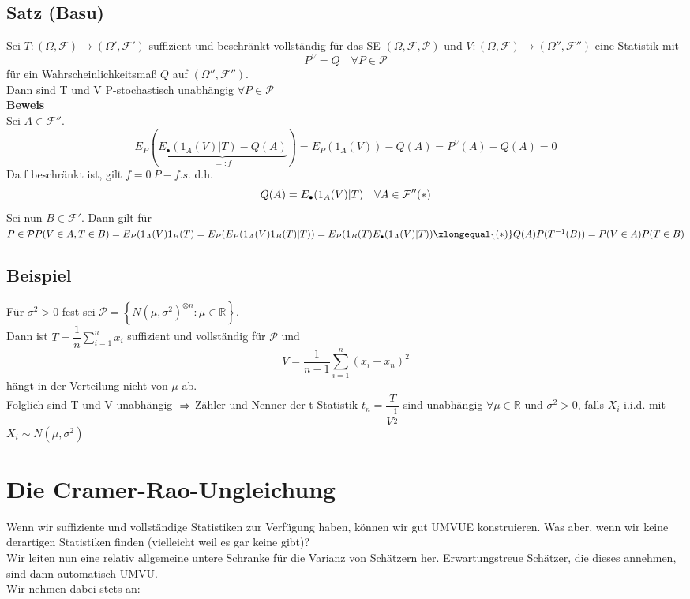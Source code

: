 \documentclass[german,10pt,oneside, fleqn, a4paper]{article}
\newcommand {\R}	{\mathbb{R}}
\newcommand{\Ra}	{\Rightarrow}
\newcommand{\ra}{\rightarrow}
\newcommand{\sm}[2][\infty]{\sum\limits_{#2}^{#1}}
\newcommand{\brc}[1]{\left(#1\right)}
\newcommand{\brac}[1]{\left\lbrace #1\right\rbrace}
\newcommand{\mc}[1]{\mathcal{#1}}
\newcommand{\beweis}{\textbf{Beweis}\\}
\newcommand{\1}[1]{1_{#1}}
\newcommand{\2}[1]{\1{\brac{#1}}}
\newcommand{\rraum}{\brc{\Omega,\mc{F},\mc{P}}}
\newcommand{\f}{\mc{F}}
\newcommand{\p}{\mc{P}}
\newcommand{\sumi}{\sm[n]{i=1}}
\newcommand{\qf}{\quad\forall}
\newcommand{\stuff}{{\otimes n}}
\begin{document}
\subsection{Satz (Basu)}
\label{12.8}
Sei $T:(\Omega,\f)\ra(\Omega',\f')$ suffizient und beschränkt vollständig für das SE $\rraum$ und $V:(\Omega,\f)\ra(\Omega'',\f'')$ eine Statistik mit \[
P^V=Q\qf P\in\p\]
für ein Wahrscheinlichkeitsmaß $Q$ auf $(\Omega'',\f'')$. \\
Dann sind T und V P-stochastisch unabhängig $\forall P \in\p$\\
\beweis 
Sei $A\in\f''$. \[
E_P(\underbrace{E_\bullet(1_A(V)|T)-Q(A)}_{=:f})=E_P(1_A(V))-Q(A)=P^V(A)-Q(A)=0\]
Da f beschränkt ist, gilt $f=0\ P-f.s.$ d.h. \[
Q(A)=E_\bullet(1_A(V)|T)\qf A\in\f''\hfill(*)\]
Sei nun $B\in\f'$. Dann gilt für $P\in\p\\
P(V\in A,T\in B)=E_P(1_A(V)1_B(T)=E_P(E_P(1_A(V)1_B(T)|T))=E_P(1_B(T)E_\bullet(1_A(V)|T))\xlongequal{(*)}Q(A)P(T^{-1}(B))=P(V\in A)P(T\in B)$\\

\subsection{Beispiel}
\label{12.9}
Für $\sigma^2>0$ fest sei $\p=\brac{N(\mu,\sigma^2)^\stuff:\mu\in\R}$.\\
Dann ist $T=\dfrac{1}{n}\sumi x_i$ suffizient und vollständig für $\p$ und \[
V=\dfrac{1}{n-1}\sumi (x_i-\overline{x}_n)^2\]
hängt in der Verteilung nicht von $\mu$ ab.\\
Folglich sind T und V unabhängig
$\\\Ra$ Zähler und Nenner der t-Statistik $t_n=\dfrac{T}{V^{\dfrac{1}{2}}}$ sind unabhängig $\forall \mu\in\R$ und $\sigma^2>0$, falls $X_i$ i.i.d. mit $X_i\sim N(\mu,\sigma^2)$



\pagebreak
\section{Die Cramer-Rao-Ungleichung}
Wenn wir suffiziente und vollständige Statistiken zur Verfügung haben, können wir gut UMVUE konstruieren. Was aber, wenn wir keine derartigen Statistiken finden  (vielleicht weil es gar keine gibt)?\\
Wir leiten nun eine relativ allgemeine untere Schranke für die Varianz von Schätzern her. Erwartungstreue Schätzer, die dieses annehmen, sind dann automatisch UMVU.\\
Wir nehmen dabei stets an:
\end{document}
